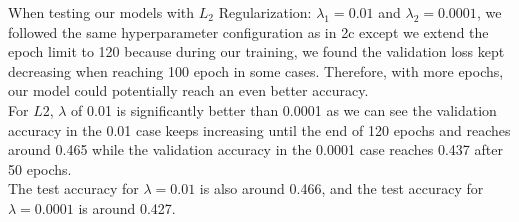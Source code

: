 \documentclass{article}
\begin{document}
    When testing our models with $L_2$ Regularization: $\lambda_1 = 0.01$ and $\lambda_2 = 0.0001$, we followed the same hyperparameter configuration as in 2c except we extend the epoch limit to 120 because during our training, we found the validation loss kept decreasing when reaching 100 epoch in some cases. Therefore, with more epochs, our model could potentially reach an even better accuracy. \\
    For $L2$, $\lambda$ of 0.01 is significantly better than 0.0001 as we can see the validation accuracy in the 0.01 case keeps increasing until the end of 120 epochs and reaches around 0.465 while the validation accuracy in the 0.0001 case reaches 0.437 after 50 epochs. \\
    The test accuracy for $\lambda=0.01$ is also around 0.466, and the test accuracy for $\lambda=0.0001$ is around 0.427.
\end{document}
